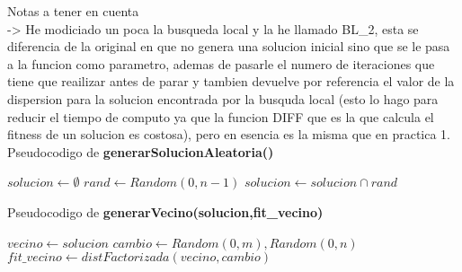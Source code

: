   Notas a tener en cuenta\\
    -> He modiciado un poca la busqueda local y la he llamado BL\_2, esta se diferencia de la original en que
    no genera una solucion inicial sino que se le pasa a la funcion como parametro, ademas de pasarle el numero de iteraciones 
    que tiene que reailizar antes de parar y tambien devuelve por referencia el valor de la dispersion para 
    la solucion encontrada por la busquda local (esto lo hago para reducir el tiempo de computo ya que
     la funcion DIFF que es la que calcula el fitness de un solucion es costosa), pero en esencia es la misma que en 
     practica 1. \\

  
     Pseudocodigo de \textbf{generarSolucionAleatoria()}
     \begin{algorithm}[H]
       \begin{algorithmic}[1]
          \State $solucion \gets \emptyset$
            \State $rand \gets Random(0,n-1)$
            \State $solucion \gets solucion \cap rand $ 
           \EndFor
           \State {}
         \EndFunction
       \end{algorithmic}
     \end{algorithm}

     Pseudocodigo de \textbf{generarVecino(solucion,fit\_vecino)}
     \begin{algorithm}[H]
       \begin{algorithmic}[1]
          \State $vecino \gets solucion$
          \State $cambio \gets Random(0,m), Random(0,n)$ 
          \State $fit\_vecino \gets distFactorizada(vecino, cambio)$
          \State {}
         \EndFunction
       \end{algorithmic}
     \end{algorithm}


